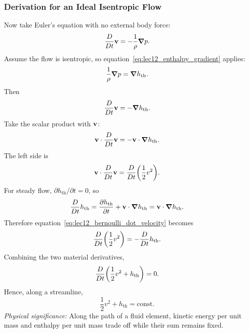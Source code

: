 \documentclass[../main.tex]{subfiles}
\begin{document}
\subsubsection{Derivation for an Ideal Isentropic Flow}\label{subsec:lec12:bernoulli-derivation}
Now take Euler's equation with no external body force:
\begin{equation}
  \frac{D}{Dt}\mathbf{v}
  =
  -\frac{1}{\rho}\grad p.
  \label{eq:lec12_euler_no_body_force}
\end{equation}
Assume the flow is isentropic, so equation~\eqref{eq:lec12_enthalpy_gradient} applies:
\begin{equation}
  \frac{1}{\rho}\grad p=\grad h_{\mathrm{th}}.
  \label{eq:lec12_pressure_to_enthalpy}
\end{equation}
Then
\begin{equation}
  \frac{D}{Dt}\mathbf{v}=-\grad h_{\mathrm{th}}.
  \label{eq:lec12_euler_enthalpy}
\end{equation}
Take the scalar product with $\mathbf{v}$:
\begin{equation}
  \mathbf{v}\cdot\frac{D}{Dt}\mathbf{v}
  =
  -\mathbf{v}\cdot\grad h_{\mathrm{th}}.
  \label{eq:lec12_bernoulli_dot_velocity}
\end{equation}
The left side is
\begin{equation}
  \mathbf{v}\cdot\frac{D}{Dt}\mathbf{v}
  =
  \frac{D}{Dt}\qty(\frac{1}{2}v^2).
  \label{eq:lec12_kinetic_material_derivative}
\end{equation}
For steady flow, $\partial h_{\mathrm{th}}/\partial t=0$, so
\begin{equation}
  \frac{D}{Dt} h_{\mathrm{th}}
  =
  \pdv{h_{\mathrm{th}}}{t}
  +
  \mathbf{v}\cdot\grad h_{\mathrm{th}}
  =
  \mathbf{v}\cdot\grad h_{\mathrm{th}}.
  \label{eq:lec12_steady_enthalpy_material}
\end{equation}
Therefore equation~\eqref{eq:lec12_bernoulli_dot_velocity} becomes
\begin{equation}
  \frac{D}{Dt}\qty(\frac{1}{2}v^2)
  =
  -\frac{D}{Dt} h_{\mathrm{th}}.
  \label{eq:lec12_bernoulli_material_step}
\end{equation}
Combining the two material derivatives,
\begin{equation}
  \frac{D}{Dt}\qty(\frac{1}{2}v^2+h_{\mathrm{th}})=0.
  \label{eq:lec12_bernoulli_material_conservation}
\end{equation}
Hence, along a streamline,
\begin{equation}
  \boxed{
  \frac{1}{2}v^2+h_{\mathrm{th}}=\mathrm{const}.}
  \label{eq:lec12_bernoulli_enthalpy}
\end{equation}
\textit{Physical significance:} Along the path of a fluid element, kinetic energy per unit mass and enthalpy per unit mass trade off while their sum remains fixed.
\end{document}
